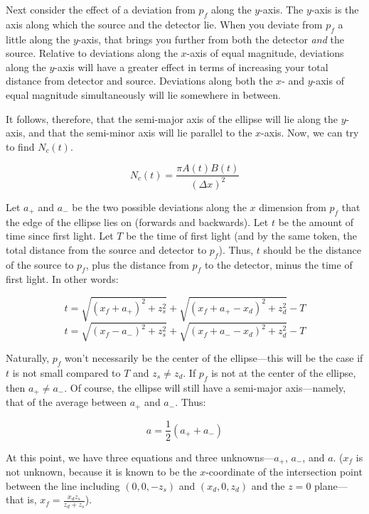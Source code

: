 \documentclass[11pt]{article}
\begin{document}
Next consider the effect of a deviation from $p_f$ along the $y$-axis. The $y$-axis is the axis along which the source and the detector lie. When you deviate from $p_f$ a little along the $y$-axis, that brings you further from both the detector \emph{and} the source. Relative to deviations along the $x$-axis of equal magnitude, deviations along the $y$-axis will have a greater effect in terms of increasing your total distance from detector and source. Deviations along both the $x$- and $y$-axis of equal magnitude simultaneously will lie somewhere in between.

It follows, therefore, that the semi-major axis of the ellipse will lie along the $y$-axis, and that the semi-minor axis will lie parallel to the $x$-axis. Now, we can try to find $N_c(t)$.

\begin{equation}
N_c(t) = \frac{\pi A(t) B(t)}{(\Delta x)^2}
\end{equation}

Let $a_+$ and $a_-$ be the two possible deviations along the $x$ dimension from $p_f$ that the edge of the ellipse lies on (forwards and backwards). Let $t$ be the amount of time since first light. Let $T$ be the time of first light (and by the same token, the total distance from the source and detector to $p_f$). Thus, $t$ should be the distance of the source to $p_f$, plus the distance from $p_f$ to the detector, minus the time of first light. In other words:

\begin{equation}
t = \sqrt{(x_f+a_+)^2 + z_s^2} + \sqrt{(x_f+a_+-x_d)^2 + z_d^2} - T 
\end{equation}
\begin{equation}
t = \sqrt{(x_f-a_-)^2 + z_s^2} + \sqrt{(x_f+a_--x_d)^2 + z_d^2} - T
\end{equation}

Naturally, $p_f$ won't necessarily be the center of the ellipse---this will be the case if $t$ is not small compared to $T$ and $z_s \not= z_d$. If $p_f$ is not at the center of the ellipse, then $a_+ \not= a_-$. Of course, the ellipse will still have a semi-major axis---namely, that of the average between $a_+$ and $a_-$. Thus:

\begin{equation}
a = \frac{1}{2}(a_+ + a_-)
\end{equation}

At this point, we have three equations and three unknowns---$a_+$, $a_-$, and $a$. ($x_f$ is not unknown, because it is known to be the $x$-coordinate of the intersection point between the line including $(0,0,-z_s)$ and $(x_d, 0, z_d)$ and the $z=0$ plane---that is, $x_f = \frac{x_dz_s}{z_d + z_s}$).
\end{document}
